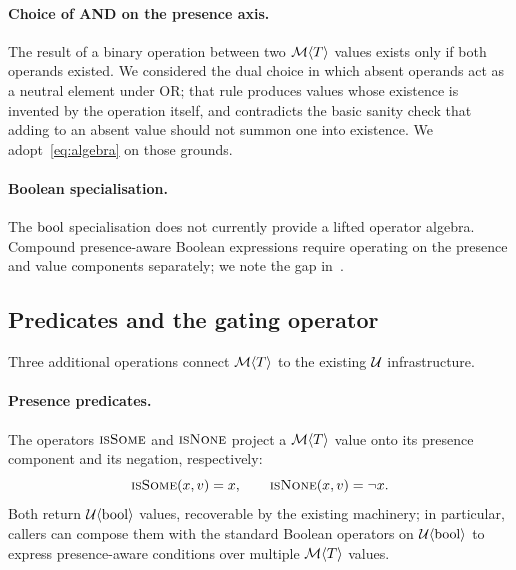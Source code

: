 \paragraph{Choice of AND on the presence axis.} The result of a binary
operation between two $\mathcal{M}\langle T \rangle$ values exists only if both
operands existed. We considered the dual choice in which absent operands
act as a neutral element under OR; that rule produces values whose
existence is invented by the operation itself, and contradicts the basic
sanity check that adding to an absent value should not summon one into
existence. We adopt~\eqref{eq:algebra} on those grounds.

\paragraph{Boolean specialisation.} The $\mathrm{bool}$ specialisation does not
currently provide a lifted operator algebra. Compound presence-aware
Boolean expressions require operating on the presence and value components
separately; we note the gap in~.

\subsection{Predicates and the gating operator}
\label{sec:type:predicates}

Three additional operations connect $\mathcal{M}\langle T \rangle$ to the
existing $\mathcal{U}$ infrastructure.

\paragraph{Presence predicates.} The operators $\textsc{isSome}$ and
$\textsc{isNone}$ project a $\mathcal{M}\langle T \rangle$ value onto its
presence component and its negation, respectively:
\begin{equation*}
\textsc{isSome}(x, v) = x, \qquad \textsc{isNone}(x, v) = \neg x.
\end{equation*}
Both return $\mathcal{U}\langle \mathrm{bool} \rangle$ values, recoverable by the existing
machinery; in particular, callers can compose them with the standard
Boolean operators on $\mathcal{U}\langle \mathrm{bool} \rangle$ to express
presence-aware conditions over multiple $\mathcal{M}\langle T \rangle$ values.

